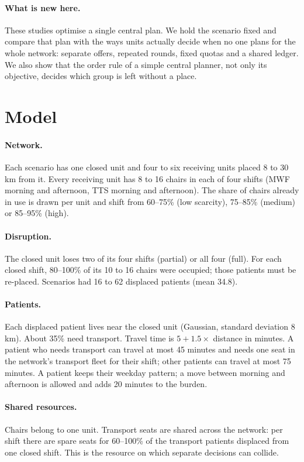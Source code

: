\documentclass[11pt,a4paper]{article}
\begin{document}
\paragraph{What is new here.} These studies optimise a single central plan. We hold the scenario fixed and
compare that plan with the ways units actually decide when no one plans for the whole network: separate offers,
repeated rounds, fixed quotas and a shared ledger. We also show that the order rule of a simple central planner,
not only its objective, decides which group is left without a place.

\section{Model}
\paragraph{Network.} Each scenario has one closed unit and four to six receiving units placed 8 to 30\,km
from it. Every receiving unit has 8 to 16 chairs in each of four shifts (MWF morning and afternoon, TTS
morning and afternoon). The share of chairs already in use is drawn per unit and shift from 60--75\% (low
scarcity), 75--85\% (medium) or 85--95\% (high).

\paragraph{Disruption.} The closed unit loses two of its four shifts (partial) or all four (full). For each
closed shift, 80--100\% of its 10 to 16 chairs were occupied; those patients must be re-placed. Scenarios had
16 to 62 displaced patients (mean 34.8).

\paragraph{Patients.} Each displaced patient lives near the closed unit (Gaussian, standard deviation 8\,km).
About 35\% need transport. Travel time is $5 + 1.5 \times$ distance in minutes. A patient who needs transport
can travel at most 45 minutes and needs one seat in the network's transport fleet for their shift; other
patients can travel at most 75 minutes. A patient keeps their weekday pattern; a move between morning and
afternoon is allowed and adds 20 minutes to the burden.

\paragraph{Shared resources.} Chairs belong to one unit. Transport seats are shared across the network: per
shift there are spare seats for 60--100\% of the transport patients displaced from one closed shift. This is
the resource on which separate decisions can collide.
\end{document}
